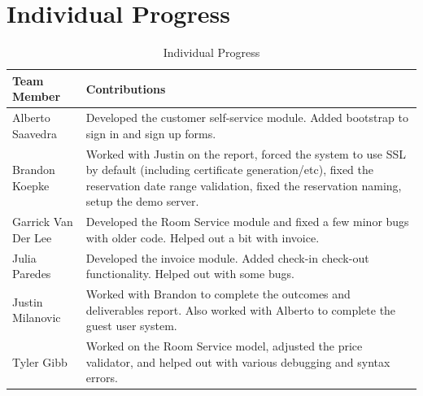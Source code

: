 \documentclass[12pt]{elsarticle}
\begin{document}
\section{Individual Progress}

\begin{table}[!ht]
  \begin{tabular}{|l|p{11cm}|}
    \hline
    \textbf{Team Member} & \textbf{Contributions} \\
    \hline
    Alberto Saavedra & Developed the customer self-service module. Added bootstrap to sign in and sign up forms. \\
    \hline
    Brandon Koepke & Worked with Justin on the report, forced the system to use SSL by default (including certificate generation/etc), fixed the reservation date range validation, fixed the reservation naming, setup the demo server. \\
    \hline
    Garrick Van Der Lee & Developed the Room Service module and fixed a few minor bugs with older code. Helped out a bit with invoice. \\
    \hline
    Julia Paredes & Developed the invoice module. Added check-in check-out functionality. Helped out with some bugs. \\
    \hline
    Justin Milanovic & Worked with Brandon to complete the outcomes and deliverables report. Also worked with Alberto to complete the guest user system. \\
    \hline
    Tyler Gibb & Worked on the Room Service model, adjusted the price validator, and helped out with various debugging and syntax errors. \\
    \hline
  \end{tabular}
	\caption{Individual Progress}
\end{table}
\end{document}
